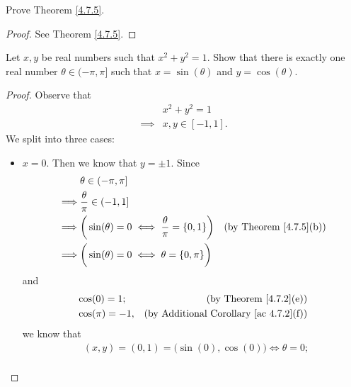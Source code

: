 \begin{exercise}\label{ex 4.7.3}
    Prove Theorem \ref{4.7.5}.
\end{exercise}

\begin{proof}
    See Theorem \ref{4.7.5}.
\end{proof}

\begin{exercise}\label{ex 4.7.4}
    Let \(x, y\) be real numbers such that \(x^2 + y^2 = 1\).
    Show that there is exactly one real number \(\theta \in (-\pi, \pi]\) such that \(x = \sin(\theta)\) and \(y = \cos(\theta)\).
\end{exercise}

\begin{proof}
    Observe that
    \begin{align*}
                 & x^2 + y^2 = 1     \\
        \implies & x, y \in [-1, 1].
    \end{align*}
    We split into three cases:
    \begin{itemize}
        \item \(x = 0\).
              Then we know that \(y = \pm 1\).
              Since
              \begin{align*}
                           & \theta \in (-\pi, \pi]                                                                               \\
                  \implies & \frac{\theta}{\pi} \in (-1, 1]                                                                       \\
                  \implies & \bigg(\sin(\theta) = 0 \iff \frac{\theta}{\pi} = \{0, 1\}\bigg) & \text{(by Theorem \ref{4.7.5}(b))} \\
                  \implies & \bigg(\sin(\theta) = 0 \iff \theta = \{0, \pi\}\bigg)
              \end{align*}
              and
              \begin{align*}
                   & \cos(0) = 1;    & \text{(by Theorem \ref{4.7.2}(e))}                 \\
                   & \cos(\pi) = -1, & \text{(by Additional Corollary \ref{ac 4.7.2}(f))}
              \end{align*}
              we know that
              \begin{align*}
                   & (x, y) = (0, 1) = \big(\sin(0), \cos(0)\big) \iff \theta = 0;        \\

\end{align*}
\end{itemize}
\end{proof}
